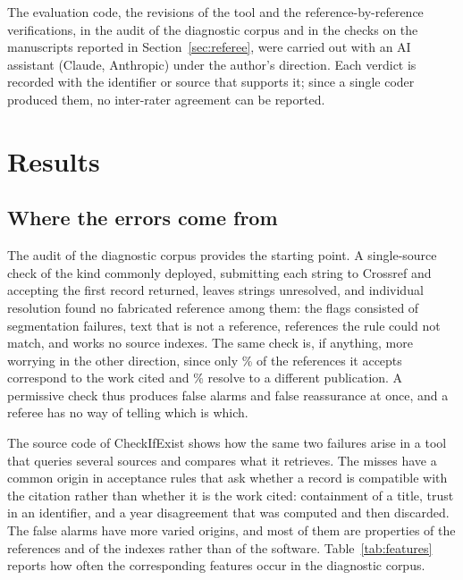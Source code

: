\documentclass[pdflatex,sn-apa]{sn-jnl}
\begin{document}
The evaluation code, the revisions of the tool and the reference-by-reference verifications, in the audit of the diagnostic corpus and in the checks on the manuscripts reported in Section~\ref{sec:referee}, were carried out with an AI assistant (Claude, Anthropic) under the author's direction. Each verdict is recorded with the identifier or source that supports it; since a single coder produced them, no inter-rater agreement can be reported.

\section{Results}
\label{sec:results}

\subsection{Where the errors come from}
\label{sec:diagnosis}

The audit of the diagnostic corpus provides the starting point. A single-source check of the kind commonly deployed, submitting each string to Crossref and accepting the first record returned, leaves \Nflag{} strings unresolved, and individual resolution found no fabricated reference among them: the flags consisted of segmentation failures, text that is not a reference, references the rule could not match, and works no source indexes. The same check is, if anything, more worrying in the other direction, since only \Pcmatchcorrect{}\% of the references it accepts correspond to the work cited and \Pcmatchwrong{}\% resolve to a different publication. A permissive check thus produces false alarms and false reassurance at once, and a referee has no way of telling which is which.

The source code of CheckIfExist shows how the same two failures arise in a tool that queries several sources and compares what it retrieves. The misses have a common origin in acceptance rules that ask whether a record is compatible with the citation rather than whether it is the work cited: containment of a title, trust in an identifier, and a year disagreement that was computed and then discarded. The false alarms have more varied origins, and most of them are properties of the references and of the indexes rather than of the software. Table~\ref{tab:features} reports how often the corresponding features occur in the diagnostic corpus.

\begin{table}[htbp]
\centering
\caption{Features of reference strings associated with errors of automated checking, as a percentage of strings in each stratum of the diagnostic corpus. Title-less references are single references with no stretch of four or more words between punctuation marks; merged entries contain several references run together.}
\label{tab:features}
\vspace{4pt}
\footnotesize
\setlength{\tabcolsep}{3.5pt}

\end{table}
\end{document}
